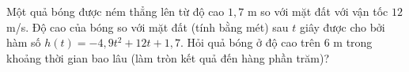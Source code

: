 \begin{bt}%
Một quả bóng được ném thẳng lên từ độ cao $1{,}7$ m so với mặt đất với vận tốc $12$ m/s. Độ cao của bóng so với mặt đất (tính bằng mét) sau $t$ giây được cho bởi hàm số $h(t)=-4{,}9t^2+12t+1{,}7$. Hỏi quả bóng ở độ cao trên $6$ m trong khoảng thời gian bao lâu (làm tròn kết quả đến hàng phần trăm)?
\end{bt}

